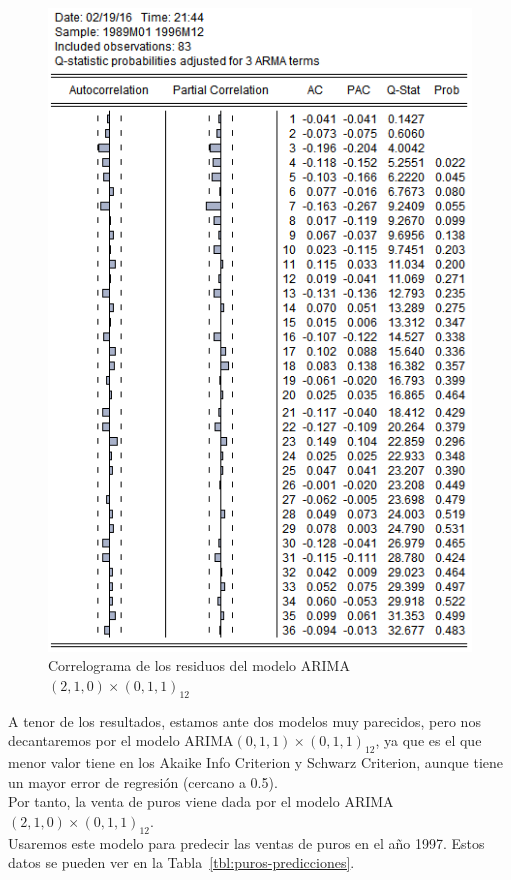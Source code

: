 \documentclass[12pt,a4paper,twoside,openright,titlepage,final]{article}
\begin{document}
\begin{figure}[tbph!]
	\centering
	\includegraphics[width=0.8\linewidth]{imagenes/puros/modelo2-residuos-correlograma.png}
	\caption{Correlograma de los residuos del modelo ARIMA$(2,1,0)\times(0,1,1)_{12}$}
	\label{fig:modelo2-puros-residuos-correlograma}
\end{figure}

A tenor de los resultados, estamos ante dos modelos muy parecidos, pero nos decantaremos por el modelo ARIMA$(0,1,1)\times(0,1,1)_{12}$, ya que es el que menor valor tiene en los Akaike Info Criterion y Schwarz Criterion, aunque tiene un mayor error de regresión (cercano a 0.5).\\

Por tanto, la venta de puros viene dada por el modelo ARIMA$(2,1,0)\times(0,1,1)_{12}$.\\

Usaremos este modelo para predecir las ventas de puros en el año 1997. Estos datos se pueden ver en la Tabla~\ref{tbl:puros-predicciones}.\\
\end{document}
